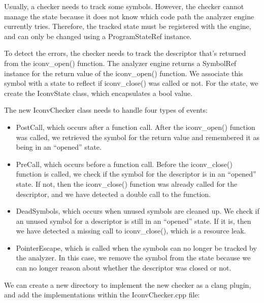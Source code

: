Usually, a checker needs to track some symbols. However, the checker cannot manage the state because it does not know which code path the analyzer engine currently tries. Therefore, the tracked state must be registered with the engine, and can only be changed using a ProgramStateRef instance.

To detect the errors, the checker needs to track the descriptor that’s returned from the iconv\_open() function. The analyzer engine returns a SymbolRef instance for the return value of the iconv\_open() function. We associate this symbol with a state to reflect if iconv\_close() was called or not. For the state, we create the IconvState class, which encapsulates a bool value.

The new IconvChecker class needs to handle four types of events:

\begin{itemize}
\item
PostCall, which occurs after a function call. After the iconv\_open() function was called, we retrieved the symbol for the return value and remembered it as being in an “opened” state.

\item
PreCall, which occurs before a function call. Before the iconv\_close() function is called, we check if the symbol for the descriptor is in an “opened” state. If not, then the iconv\_close() function was already called for the descriptor, and we have detected a double call to the function.

\item
DeadSymbols, which occurs when unused symbols are cleaned up. We check if an unused symbol for a descriptor is still in an “opened” state. If it is, then we have detected a missing call to iconv\_close(), which is a resource leak.

\item
PointerEscape, which is called when the symbols can no longer be tracked by the analyzer. In this case, we remove the symbol from the state because we can no longer reason about whether the descriptor was closed or not.
\end{itemize}

We can create a new directory to implement the new checker as a clang plugin, and add the implementations within the IconvChecker.cpp file:

